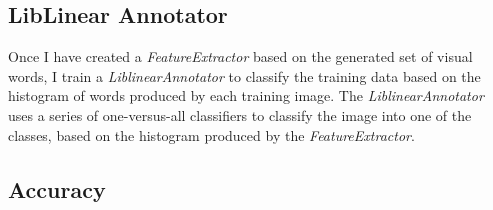 \documentclass{article}
\begin{document}
	\subsection{ LibLinear Annotator }
	
	Once I have created a \textit{FeatureExtractor} based on the generated set of visual words, I train a \textit{LiblinearAnnotator} to classify the training data based on the histogram of words produced by each training image. The \textit{LiblinearAnnotator} uses a series of one-versus-all classifiers to classify the image into one of the classes, based on the histogram produced by the \textit{FeatureExtractor}.
	
	\subsection{ Accuracy }
	
\end{document}
